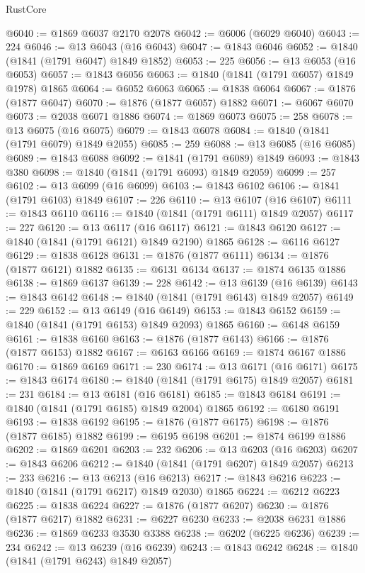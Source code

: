 \begin{lexlean}{RustCore}
\begin{coremodule}
@6040 := @1869 @6037 @2170 @2078
@6042 := @6006 (@6029 @6040)
@6043 := 224
@6046 := @13 @6043 (@16 @6043)
@6047 := @1843 @6046
@6052 := @1840 (@1841 (@1791 @6047) @1849 @1852)
@6053 := 225
@6056 := @13 @6053 (@16 @6053)
@6057 := @1843 @6056
@6063 := @1840 (@1841 (@1791 @6057) @1849 @1978) @1865
@6064 := @6052 @6063
@6065 := @1838 @6064
@6067 := @1876 (@1877 @6047)
@6070 := @1876 (@1877 @6057) @1882
@6071 := @6067 @6070
@6073 := @2038 @6071 @1886
@6074 := @1869 @6073
@6075 := 258
@6078 := @13 @6075 (@16 @6075)
@6079 := @1843 @6078
@6084 := @1840 (@1841 (@1791 @6079) @1849 @2055)
@6085 := 259
@6088 := @13 @6085 (@16 @6085)
@6089 := @1843 @6088
@6092 := @1841 (@1791 @6089) @1849
@6093 := @1843 @380
@6098 := @1840 (@1841 (@1791 @6093) @1849 @2059)
@6099 := 257
@6102 := @13 @6099 (@16 @6099)
@6103 := @1843 @6102
@6106 := @1841 (@1791 @6103) @1849
@6107 := 226
@6110 := @13 @6107 (@16 @6107)
@6111 := @1843 @6110
@6116 := @1840 (@1841 (@1791 @6111) @1849 @2057)
@6117 := 227
@6120 := @13 @6117 (@16 @6117)
@6121 := @1843 @6120
@6127 := @1840 (@1841 (@1791 @6121) @1849 @2190) @1865
@6128 := @6116 @6127
@6129 := @1838 @6128
@6131 := @1876 (@1877 @6111)
@6134 := @1876 (@1877 @6121) @1882
@6135 := @6131 @6134
@6137 := @1874 @6135 @1886
@6138 := @1869 @6137
@6139 := 228
@6142 := @13 @6139 (@16 @6139)
@6143 := @1843 @6142
@6148 := @1840 (@1841 (@1791 @6143) @1849 @2057)
@6149 := 229
@6152 := @13 @6149 (@16 @6149)
@6153 := @1843 @6152
@6159 := @1840 (@1841 (@1791 @6153) @1849 @2093) @1865
@6160 := @6148 @6159
@6161 := @1838 @6160
@6163 := @1876 (@1877 @6143)
@6166 := @1876 (@1877 @6153) @1882
@6167 := @6163 @6166
@6169 := @1874 @6167 @1886
@6170 := @1869 @6169
@6171 := 230
@6174 := @13 @6171 (@16 @6171)
@6175 := @1843 @6174
@6180 := @1840 (@1841 (@1791 @6175) @1849 @2057)
@6181 := 231
@6184 := @13 @6181 (@16 @6181)
@6185 := @1843 @6184
@6191 := @1840 (@1841 (@1791 @6185) @1849 @2004) @1865
@6192 := @6180 @6191
@6193 := @1838 @6192
@6195 := @1876 (@1877 @6175)
@6198 := @1876 (@1877 @6185) @1882
@6199 := @6195 @6198
@6201 := @1874 @6199 @1886
@6202 := @1869 @6201
@6203 := 232
@6206 := @13 @6203 (@16 @6203)
@6207 := @1843 @6206
@6212 := @1840 (@1841 (@1791 @6207) @1849 @2057)
@6213 := 233
@6216 := @13 @6213 (@16 @6213)
@6217 := @1843 @6216
@6223 := @1840 (@1841 (@1791 @6217) @1849 @2030) @1865
@6224 := @6212 @6223
@6225 := @1838 @6224
@6227 := @1876 (@1877 @6207)
@6230 := @1876 (@1877 @6217) @1882
@6231 := @6227 @6230
@6233 := @2038 @6231 @1886
@6236 := @1869 @6233 @3530 @3388
@6238 := @6202 (@6225 @6236)
@6239 := 234
@6242 := @13 @6239 (@16 @6239)
@6243 := @1843 @6242
@6248 := @1840 (@1841 (@1791 @6243) @1849 @2057)

\end{coremodule}
\end{lexlean}
